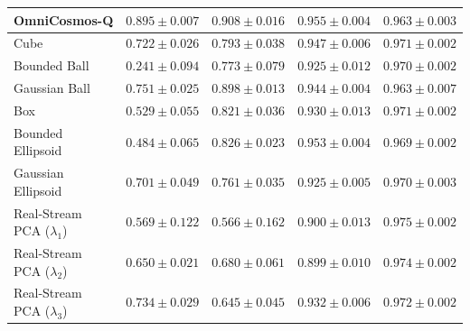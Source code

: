 {\begin{tabular}{lcccc}
OmniCosmos-Q & $\mathbf{0.895 \pm 0.007}$ & $\mathbf{0.908 \pm 0.016}$ & $\mathbf{0.955 \pm 0.004}$ & $0.963 \pm 0.003$ \\
\midrule
Cube & $0.722 \pm 0.026$ & $0.793 \pm 0.038$ & $0.947 \pm 0.006$ & $0.971 \pm 0.002$ \\
Bounded Ball & $0.241 \pm 0.094$ & $0.773 \pm 0.079$ & $0.925 \pm 0.012$ & $0.970 \pm 0.002$ \\
Gaussian Ball & $0.751 \pm 0.025$ & $0.898 \pm 0.013$ & $0.944 \pm 0.004$ & $0.963 \pm 0.007$ \\
Box & $0.529 \pm 0.055$ & $0.821 \pm 0.036$ & $0.930 \pm 0.013$ & $0.971 \pm 0.002$ \\
Bounded Ellipsoid & $0.484 \pm 0.065$ & $0.826 \pm 0.023$ & $0.953 \pm 0.004$ & $0.969 \pm 0.002$ \\
Gaussian Ellipsoid & $0.701 \pm 0.049$ & $0.761 \pm 0.035$ & $0.925 \pm 0.005$ & $0.970 \pm 0.003$ \\
\midrule
Real-Stream PCA ($\lambda_1$) & $0.569 \pm 0.122$ & $0.566 \pm 0.162$ & $0.900 \pm 0.013$ & $\mathbf{0.975 \pm 0.002}$ \\
Real-Stream PCA ($\lambda_2$) & $0.650 \pm 0.021$ & $0.680 \pm 0.061$ & $0.899 \pm 0.010$ & $0.974 \pm 0.002$ \\
Real-Stream PCA ($\lambda_3$) & $0.734 \pm 0.029$ & $0.645 \pm 0.045$ & $0.932 \pm 0.006$ & $0.972 \pm 0.002$ \\
\bottomrule
\end{tabular}
}
